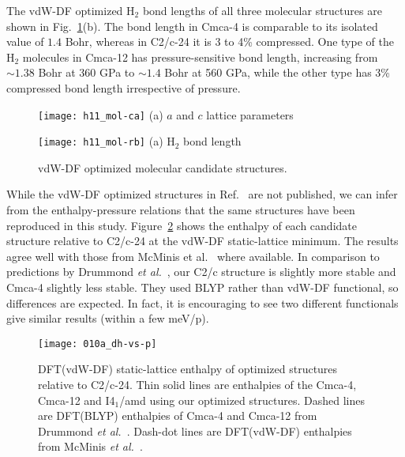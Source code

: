 The vdW-DF optimized H$_2$ bond lengths of all three molecular structures are shown in Fig.~\ref{fig:hsolid-vdw-ca}(b).
The bond length in Cmca-4 is comparable to its isolated value of $1.4$ Bohr, whereas in C2/c-24 it is 3 to 4\% compressed.
One type of the H$_2$ molecules in Cmca-12 has pressure-sensitive bond length, increasing from $\sim 1.38$ Bohr at 360 GPa to $\sim 1.4$ Bohr at 560 GPa, while the other type has 3\% compressed bond length irrespective of pressure.

\begin{figure}[h]
\centering
\begin{minipage}{0.49\textwidth}
\centering
\texttt{[image: h11\_mol-ca]}
(a) $a$ and $c$ lattice parameters
\end{minipage}
\begin{minipage}{0.49\textwidth}
\centering
\texttt{[image: h11\_mol-rb]}
(a) H$_2$ bond length
\end{minipage}
\caption{vdW-DF optimized molecular candidate structures.}
\label{fig:hsolid-vdw-ca}
\end{figure}

While the vdW-DF optimized structures in Ref.~\cite{McMinis2015} are not published, we can infer from the enthalpy-pressure relations that the same structures have been reproduced in this study. Figure~\ref{fig:dft-opt-geo} shows the enthalpy of each candidate structure relative to C2/c-24 at the vdW-DF static-lattice minimum. The results agree well with those from McMinis et al.~\cite{McMinis2015} where available.
In comparison to predictions by Drummond \textit{et al.}~\cite{Drummond2015}, our C2/c structure is slightly more stable and Cmca-4 slightly less stable.
They used BLYP rather than vdW-DF functional, so differences are expected. In fact, it is encouraging to see two different functionals give similar results (within a few meV/p).

\begin{figure}[h]
\centering
\texttt{[image: 010a\_dh-vs-p]}
\caption{DFT(vdW-DF) static-lattice enthalpy of optimized structures relative to C2/c-24. Thin solid lines are enthalpies of the Cmca-4, Cmca-12 and I4$_1$/amd using our optimized structures. Dashed lines are DFT(BLYP) enthalpies of Cmca-4 and Cmca-12 from Drummond \textit{et al.}~\cite{Drummond2015}. Dash-dot lines are DFT(vdW-DF) enthalpies from McMinis \textit{et al.}~\cite{McMinis2015}.}
\label{fig:dft-opt-geo}
\end{figure}

